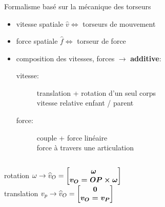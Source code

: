 \documentclass[10pt]{beamer}
\begin{document}
\begin{frame}
  \frametitle{}
  
  \begin{block}{Formalisme basé sur la mécanique des torseurs}
  \begin{spacing}{1}
  \begin{itemize}
	  \item vitesse spatiale $\widehat{v} \iff$ torseurs de mouvement
	  \item force spatiale $\widehat{f} \iff$ torseur de force
	  \item composition des vitesses, forces $\longrightarrow$ \textbf{additive}:
	  \begin{description}
	    \item[vitesse:] translation + rotation d'un seul corps \\
	                    vitesse relative enfant / parent
	    \item[force:] couple + force linéaire \\
	                  force à travers une articulation
	  \end{description}
  \end{itemize}
  \end{spacing}
  \end{block}
  
  \begin{columns}[onlytextwidth]
    \begin{column}{.5\textwidth}\footnotesize
		  rotation $\omega \rightarrow \widehat{v}_O = \boldsymbol{\begin{bmatrix} \omega \\ v_O = OP \times \omega \end{bmatrix}} \quad$ \\
		  translation $v_p \rightarrow \widehat{v}_O = \boldsymbol{\begin{bmatrix} 0 \\ v_O = v_P \end{bmatrix}}$
    \end{column}
    \begin{column}{.5\textwidth}
      \vspace{-0.5cm} 
    \end{column}
  \end{columns}
  
\end{frame}
\end{document}
